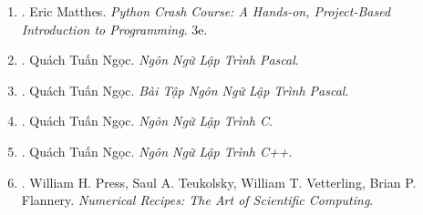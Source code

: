 \documentclass{article}
\begin{document}
\begin{enumerate}
	\item \cite{Matthes2023}. Eric Matthes. {\it Python Crash Course: A Hands-on, Project-Based Introduction to Programming}. 3e.\hfill{\sf[reading]}
	
	\item \cite{Ngoc_Pascal}. Quách Tuấn Ngọc. {\it Ngôn Ngữ Lập Trình Pascal}.\hfill{\sf[reading]}
	
	\item \cite{Ngoc_BT_Pascal}. Quách Tuấn Ngọc. {\it Bài Tập Ngôn Ngữ Lập Trình Pascal}.\hfill{\sf[reading]}
	
	\item \cite{Ngoc_C}. Quách Tuấn Ngọc. {\it Ngôn Ngữ Lập Trình C}.\hfill{\sf[reading]}
	
	\item \cite{Ngoc_C++}. Quách Tuấn Ngọc. {\it Ngôn Ngữ Lập Trình C++}.\hfill{\sf[done]}
	
	\item \cite{Press_Teukolsky_Vetterling_Flannery_recipe_C++}. {\sc William H. Press, Saul A. Teukolsky, William T. Vetterling, Brian P. Flannery}. {\it Numerical Recipes: The Art of Scientific Computing}. {}
	

\end{enumerate}
\end{document}
